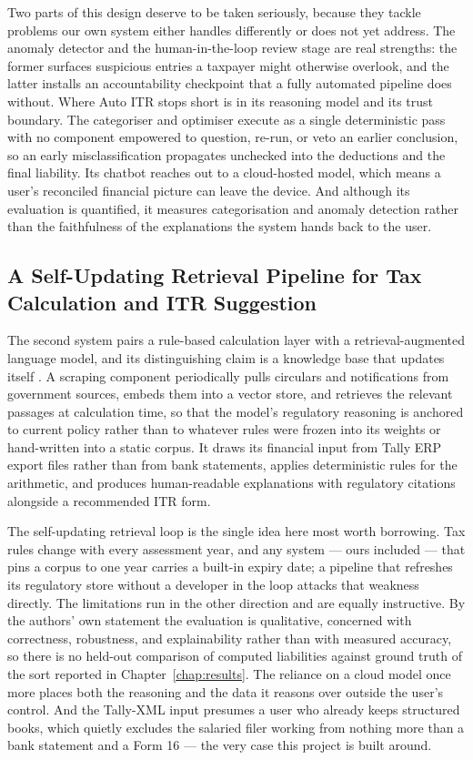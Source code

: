 Two parts of this design deserve to be taken seriously, because they tackle
problems our own system either handles differently or does not yet address. The
anomaly detector and the human-in-the-loop review stage are real strengths: the
former surfaces suspicious entries a taxpayer might otherwise overlook, and the
latter installs an accountability checkpoint that a fully automated pipeline does
without. Where Auto ITR stops short is in its reasoning model and its trust
boundary. The categoriser and optimiser execute as a single deterministic pass
with no component empowered to question, re-run, or veto an earlier conclusion,
so an early misclassification propagates unchecked into the deductions and the
final liability. Its chatbot reaches out to a cloud-hosted model, which means a
user's reconciled financial picture can leave the device. And although its
evaluation is quantified, it measures categorisation and anomaly detection rather
than the faithfulness of the explanations the system hands back to the user.

\subsection{A Self-Updating Retrieval Pipeline for Tax Calculation and ITR Suggestion}
The second system pairs a rule-based calculation layer with a
retrieval-augmented language model, and its distinguishing claim is a knowledge
base that updates itself \cite{ref14}. A scraping component periodically pulls
circulars and notifications from government sources, embeds them into a vector
store, and retrieves the relevant passages at calculation time, so that the
model's regulatory reasoning is anchored to current policy rather than to
whatever rules were frozen into its weights or hand-written into a static corpus.
It draws its financial input from Tally ERP export files rather than from bank
statements, applies deterministic rules for the arithmetic, and produces
human-readable explanations with regulatory citations alongside a recommended ITR
form.

The self-updating retrieval loop is the single idea here most worth borrowing.
Tax rules change with every assessment year, and any system --- ours included ---
that pins a corpus to one year carries a built-in expiry date; a pipeline that
refreshes its regulatory store without a developer in the loop attacks that
weakness directly. The limitations run in the other direction and are equally
instructive. By the authors' own statement the evaluation is qualitative,
concerned with correctness, robustness, and explainability rather than with
measured accuracy, so there is no held-out comparison of computed liabilities
against ground truth of the sort reported in Chapter~\ref{chap:results}. The
reliance on a cloud model once more places both the reasoning and the data it
reasons over outside the user's control. And the Tally-XML input presumes a user
who already keeps structured books, which quietly excludes the salaried filer
working from nothing more than a bank statement and a Form 16 --- the very case
this project is built around.

